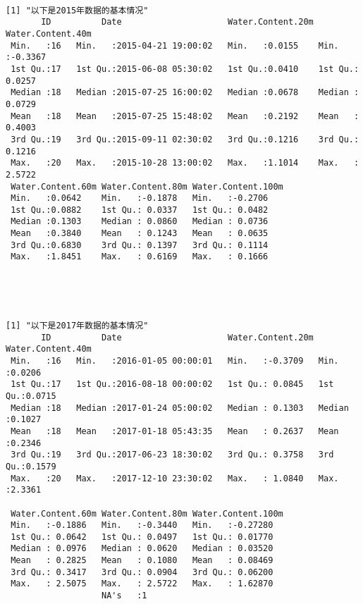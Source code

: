 \documentclass[11pt]{article}
\begin{document}
    \begin{Verbatim}[commandchars=\\\{\}]

[1] "以下是2015年数据的基本情况"
       ID          Date                     Water.Content.20m Water.Content.40m
 Min.   :16   Min.   :2015-04-21 19:00:02   Min.   :0.0155    Min.   :-0.3367  
 1st Qu.:17   1st Qu.:2015-06-08 05:30:02   1st Qu.:0.0410    1st Qu.: 0.0257  
 Median :18   Median :2015-07-25 16:00:02   Median :0.0678    Median : 0.0729  
 Mean   :18   Mean   :2015-07-25 15:48:02   Mean   :0.2192    Mean   : 0.4003  
 3rd Qu.:19   3rd Qu.:2015-09-11 02:30:02   3rd Qu.:0.1216    3rd Qu.: 0.1216  
 Max.   :20   Max.   :2015-10-28 13:00:02   Max.   :1.1014    Max.   : 2.5722  
 Water.Content.60m Water.Content.80m Water.Content.100m
 Min.   :0.0642    Min.   :-0.1878   Min.   :-0.2706   
 1st Qu.:0.0882    1st Qu.: 0.0337   1st Qu.: 0.0482   
 Median :0.1303    Median : 0.0860   Median : 0.0736   
 Mean   :0.3840    Mean   : 0.1243   Mean   : 0.0635   
 3rd Qu.:0.6830    3rd Qu.: 0.1397   3rd Qu.: 0.1114   
 Max.   :1.8451    Max.   : 0.6169   Max.   : 0.1666   


    \end{Verbatim}

    \begin{center}
    \end{center}
    { \hspace*{\fill} \\}
    
    \begin{Verbatim}[commandchars=\\\{\}]

[1] "以下是2017年数据的基本情况"
       ID          Date                     Water.Content.20m Water.Content.40m
 Min.   :16   Min.   :2016-01-05 00:00:01   Min.   :-0.3709   Min.   :0.0206   
 1st Qu.:17   1st Qu.:2016-08-18 00:00:02   1st Qu.: 0.0845   1st Qu.:0.0715   
 Median :18   Median :2017-01-24 05:00:02   Median : 0.1303   Median :0.1027   
 Mean   :18   Mean   :2017-01-18 05:43:35   Mean   : 0.2637   Mean   :0.2346   
 3rd Qu.:19   3rd Qu.:2017-06-23 18:30:02   3rd Qu.: 0.3758   3rd Qu.:0.1579   
 Max.   :20   Max.   :2017-12-10 23:30:02   Max.   : 1.0840   Max.   :2.3361   
                                                                               
 Water.Content.60m Water.Content.80m Water.Content.100m
 Min.   :-0.1886   Min.   :-0.3440   Min.   :-0.27280  
 1st Qu.: 0.0642   1st Qu.: 0.0497   1st Qu.: 0.01770  
 Median : 0.0976   Median : 0.0620   Median : 0.03520  
 Mean   : 0.2825   Mean   : 0.1080   Mean   : 0.08469  
 3rd Qu.: 0.3417   3rd Qu.: 0.0904   3rd Qu.: 0.06200  
 Max.   : 2.5075   Max.   : 2.5722   Max.   : 1.62870  
                   NA's   :1                           


    \end{Verbatim}
\end{document}
